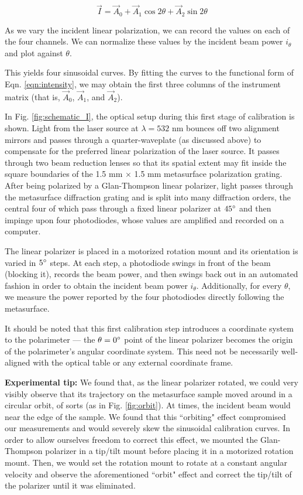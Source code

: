 \documentclass[footinbib,aps,prl,superscriptaddress]{revtex4-1}
\begin{document}
\begin{equation}
	\label{eqn:intensity}
	\vec{I} = \vec{A}_0 + \vec{A}_1 \cos2\theta + \vec{A}_2 \sin 2\theta
\end{equation} 

As we vary the incident linear polarization, we can record the values on each of the four channels. We can normalize these values by the incident beam power $i_{\theta}$ and plot against $\theta$.

This yields four sinusoidal curves. By fitting the curves to the functional form of Eqn. \ref{eqn:intensity}, we may obtain the first three columns of the instrument matrix (that is, $\vec{A}_0$, $\vec{A}_1$, and $\vec{A}_2$).

In Fig. \ref{fig:schematic_I}, the optical setup during this first stage of calibration is shown. Light from the laser source at $\lambda=532$ nm bounces off two alignment mirrors and passes through a quarter-waveplate (as discussed above) to compensate for the preferred linear polarization of the laser source. It passes through two beam reduction lenses so that its spatial extent may fit inside the square boundaries of the 1.5 mm $\times$ 1.5 mm metasurface polarization grating. After being polarized by a Glan-Thompson linear polarizer, light passes through the metasurface diffraction grating and is split into many diffraction orders, the central four of which pass through a fixed linear polarizer at $45\degree$ and then impinge upon four photodiodes, whose values are amplified and recorded on a computer.

The linear polarizer is placed in a motorized rotation mount and its orientation is varied in $5\degree$ steps. At each step, a photodiode swings in front of the beam (blocking it), records the beam power, and then swings back out in an automated fashion in order to obtain the incident beam power $i_{\theta}$. Additionally, for every $\theta$, we measure the power reported by the four photodiodes directly following the metasurface.

It should be noted that this first calibration step introduces a coordinate system to the polarimeter --- the $\theta = 0\degree$ point of the linear polarizer becomes the origin of the polarimeter's angular coordinate system. This need not be necessarily well-aligned with the optical table or any external coordinate frame.

\textbf{Experimental tip:} We found that, as the linear polarizer rotated, we could very visibly observe that its trajectory on the metasurface sample moved around in a circular orbit, of sorts (as in Fig. \ref{fig:orbit}). At times, the incident beam would near the edge of the sample. We found that this ``orbiting" effect compromised our measurements and would severely skew the sinusoidal calibration curves. In order to allow ourselves freedom to correct this effect, we mounted the Glan-Thompson polarizer in a tip/tilt mount before placing it in a motorized rotation mount. Then, we would set the rotation mount to rotate at a constant angular velocity and observe the aforementioned ``orbit" effect and correct the tip/tilt of the polarizer until it was eliminated.
\end{document}
